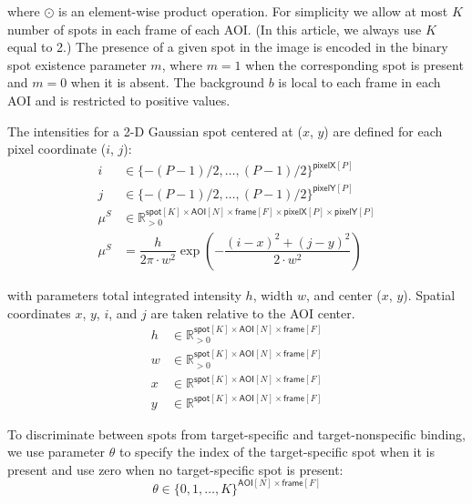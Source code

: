 \noindent
where $\odot$ is an element-wise product operation. For simplicity we allow at most $K$ number of spots in each frame of each AOI.  (In this article, we always use $K$ equal to 2.)  The presence of a given spot in the image is encoded in the binary spot existence parameter $m$, where $m = 1$ when the corresponding spot is present and $m = 0$ when it is absent. The background $b$ is local to each frame in each AOI and is restricted to positive values.



The intensities for a 2-D Gaussian spot centered at ($x$, $y$) are defined for each pixel coordinate ($i$, $j$):
%
\begin{subequations}
\begin{align}
    i &\in \{-(P-1)/2, \dots, (P-1)/2\}^{\mathsf{pixelX}[P]} \\
    j &\in \{-(P-1)/2, \dots, (P-1)/2\}^{\mathsf{pixelY}[P]} \\
    \mu^S &\in \mathbb{R}_{>0}^{\mathsf{spot}[K] \times \mathsf{AOI}[N] \times \mathsf{frame}[F] \times \mathsf{pixelX}[P] \times \mathsf{pixelY}[P]}  \\
    \mu^S &= \dfrac{h}{2 \pi \cdot w^2} \exp{\left( -\dfrac{(i-x)^2 + (j-y)^2}{2 \cdot w^2} \right)}
\end{align}
\end{subequations}

\noindent
with parameters total integrated intensity $h$, width $w$, and center ($x$, $y$). Spatial coordinates $x$, $y$, $i$, and $j$ are taken relative to the AOI center. 
%
\begin{subequations}
\begin{align}
    h &\in \mathbb{R}_{>0}^{\mathsf{spot}[K] \times \mathsf{AOI}[N] \times \mathsf{frame}[F]} \\
    w &\in \mathbb{R}_{>0}^{\mathsf{spot}[K] \times \mathsf{AOI}[N] \times \mathsf{frame}[F]} \\
    x &\in \mathbb{R}^{\mathsf{spot}[K] \times \mathsf{AOI}[N] \times \mathsf{frame}[F]} \\
    y &\in \mathbb{R}^{\mathsf{spot}[K] \times \mathsf{AOI}[N] \times \mathsf{frame}[F]}
\end{align}
\end{subequations}

To discriminate between spots from target-specific and target-nonspecific binding, we use parameter $\theta$ to specify the index of the target-specific spot when it is present and use zero when no target-specific spot is present:
%
\begin{equation}
    \theta \in \{ 0, 1, \dots, K \}^{ \mathsf{AOI}[N] \times \mathsf{frame}[F] }
\end{equation}

